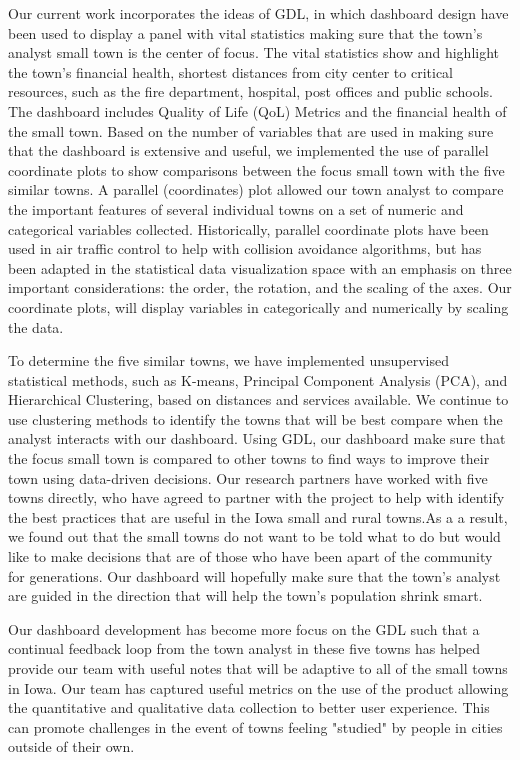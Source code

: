 \documentclass[10pt]{article}\usepackage[]{graphicx}\usepackage[]{color}
\begin{document}
Our current work incorporates the ideas of GDL, in which dashboard design have been used to display a panel with vital statistics making sure that the town's analyst small town is the center of focus. The vital statistics show and highlight the town's financial health, shortest distances from city center to critical resources, such as the fire department, hospital, post offices and public schools. The dashboard includes Quality of Life (QoL) Metrics and the financial health of the small town. Based on the number of variables that are used in making sure that the dashboard is extensive and useful, we implemented the use of parallel coordinate plots to show comparisons between the focus small town with the five similar towns. A parallel (coordinates) plot allowed our town analyst to compare the important features of several individual towns on a set of numeric and categorical variables collected. Historically, parallel coordinate plots have been used in air traffic control to help with collision avoidance algorithms, but has been adapted in the statistical data visualization space with an emphasis on three important considerations: the order, the rotation, and the scaling of the axes. Our coordinate plots, will display variables in categorically and numerically by scaling the data.

To determine the five similar towns, we have implemented unsupervised statistical methods, such as K-means, Principal Component Analysis (PCA), and Hierarchical Clustering, based on distances and services available. We continue to use clustering methods to identify the towns that will be best compare when the analyst interacts with our dashboard. Using GDL, our dashboard make sure that the focus small town is compared to other towns to find ways to improve their town using data-driven decisions. Our research partners have worked with five towns directly, who have agreed to partner with the project to help with identify the best practices that are useful in the Iowa small and rural towns.As a a result, we found out that the small towns do not want to be told what to do but would like to make decisions that are of those who have been apart of the community for generations. Our dashboard will hopefully make sure that the town's analyst are guided in the direction that will help the town's population shrink smart. 

Our dashboard development has become more focus on the GDL such that a continual feedback loop from the town analyst in these five towns has helped provide our team with useful notes that will be adaptive to all of the small towns in Iowa. Our team has captured useful metrics on the use of the product allowing the quantitative and qualitative data collection to better user experience. This can promote challenges in the event of towns feeling "studied" by people in cities outside of their own. 
\end{document}
